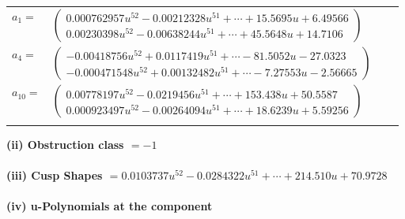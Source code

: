 \documentclass[1p]{elsarticle_modified}
\theoremstyle{definition}
\begin{document}
\begin{tabular}{m{7pt} m{180pt} m{7pt} m{180pt} }
\flushright $a_{1}=$&$\begin{pmatrix}0.000762957 u^{52}-0.00212328 u^{51}+\cdots+15.5695 u+6.49566\\0.00230398 u^{52}-0.00638244 u^{51}+\cdots+45.5648 u+14.7106\end{pmatrix}$ \\
\flushright $a_{4}=$&$\begin{pmatrix}-0.00418756 u^{52}+0.0117419 u^{51}+\cdots-81.5052 u-27.0323\\-0.000471548 u^{52}+0.00132482 u^{51}+\cdots-7.27553 u-2.56665\end{pmatrix}$ \\
\flushright $a_{10}=$&$\begin{pmatrix}0.00778197 u^{52}-0.0219456 u^{51}+\cdots+153.438 u+50.5587\\0.000923497 u^{52}-0.00264094 u^{51}+\cdots+18.6239 u+5.59256\end{pmatrix}$\\&\end{tabular}
\flushleft \textbf{(ii) Obstruction class $= -1$}\\~\\
\flushleft \textbf{(iii) Cusp Shapes $= 0.0103737 u^{52}-0.0284322 u^{51}+\cdots+214.510 u+70.9728$}\\~\\
\newpage\renewcommand{\arraystretch}{1}
\flushleft \textbf{(iv) u-Polynomials at the component}\newline \\
\end{document}
